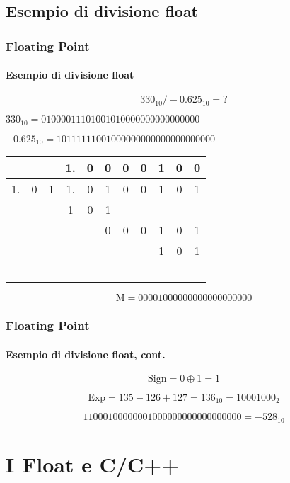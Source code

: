 \documentclass{beamer}
\begin{document}
	\subsection{Esempio di divisione float}
  \begin{frame}
    \frametitle{Floating Point}
    \framesubtitle{Esempio di divisione float}
    
		$$330_{10} / -0.625_{10} = ?$$
		
		\pause
		
		$330_{10} = 01000011101001010000000000000000$
		
		$-0.625_{10} = 10111111001000000000000000000000$
		
		\begin{center}
    		\setlength{\tabcolsep}{2pt}
    		\begin{tabular}{ccc|cccccccc}
    				&   &   & 1.& 0 & 0 & 0 & 0 & 1 & 0 & 0 \\
    		  \hline    			
    			1.& 0 & 1 & 1.& 0 & 1 & 0 & 0 & 1 & 0 & 1 \\
    			  &   &   & 1 & 0 & 1 &   &   &   &   &   \\
    			\hline
    			  &   &   &   &   & 0 & 0 & 0 & 1 & 0 & 1 \\
    			  &   &   &   &   &   &   &   & 1 & 0 & 1 \\
    			\hline
    			  &   &   &   &   &   &   &   &   &   & - \\
    		\end{tabular}
	  \end{center}		
		
		$$\text{M} = 00001000000000000000000$$ 
    
  \end{frame} 
  
  \begin{frame}
  	  \frametitle{Floating Point}
    \framesubtitle{Esempio di divisione float, cont.}
  	
    $$\text{Sign} = 0 \oplus 1 = 1$$
    
    $$\text{Exp} = 135 - 126 + 127 = 136_{10} = 10001000_{2}$$
    
    \pause
    \vspace{2em}
    
    $$11000100000001000000000000000000 = -528_{10}$$
  		
  \end{frame}
  \section{I Float e C/C++}
\end{document}
